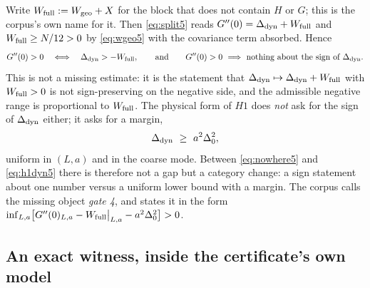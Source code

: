 Write $W_{\mathrm{full}}:=W_{\mathrm{geo}}+X$ for the block that does not contain $H$ or $G$; this is the corpus's own name
for it. Then \eqref{eq:split5} reads $G''(0)=\Delta_{\mathrm{dyn}}+W_{\mathrm{full}}$ and $W_{\mathrm{full}}\ge N/12>0$ by \eqref{eq:wgeo5} with
the covariance term absorbed. Hence
\begin{equation}
G''(0)>0\quad\Longleftrightarrow\quad \Delta_{\mathrm{dyn}}>-W_{\mathrm{full}} ,
\qquad\text{and}\qquad
G''(0)>0\ \Longrightarrow\ \text{nothing about the sign of }\Delta_{\mathrm{dyn}} .
\label{eq:nowhere5}
\end{equation}
This is not a missing estimate: it is the statement that $\Delta_{\mathrm{dyn}}\mapsto\Delta_{\mathrm{dyn}}+W_{\mathrm{full}}$ with
$W_{\mathrm{full}}>0$ is not sign-preserving on the negative side, and the admissible negative range is
proportional to $W_{\mathrm{full}}$. \LT{} The physical form of $H1$ does \emph{not} ask for the sign of $\Delta_{\mathrm{dyn}}$
either; it asks for a margin,
\begin{equation}
\Delta_{\mathrm{dyn}}\ \ge\ a^2\Delta_0^2 ,
\label{eq:h1dyn5}
\end{equation}
uniform in $(L,a)$ and in the coarse mode. Between \eqref{eq:nowhere5} and \eqref{eq:h1dyn5} there
is therefore not a gap but a category change: a sign statement about one number versus a uniform
lower bound with a margin. The corpus calls the missing object \emph{gate 4}, and states it in the
form $\inf_{L,a}\bigl[G''(0)_{L,a}-W_{\mathrm{full}}\big|_{L,a}-a^2\Delta_0^2\bigr]>0$. \LM{}


\subsection{An exact witness, inside the certificate's own model}\label{sec:wit}

